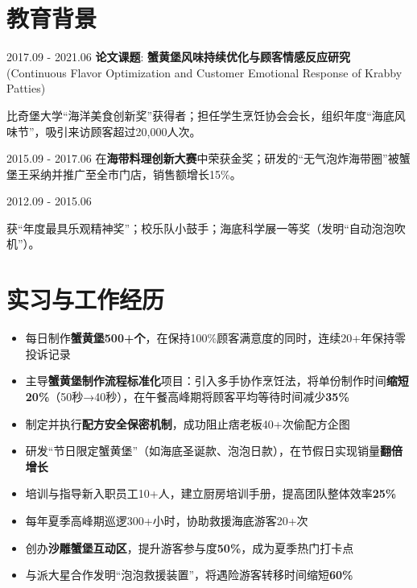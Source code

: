 \section{教育背景}

{2017.09 - 2021.06}
\textbf{论文课题}: \textbf{蟹黄堡风味持续优化与顾客情感反应研究} (Continuous Flavor Optimization and Customer Emotional Response of Krabby Patties)

比奇堡大学“海洋美食创新奖”获得者；担任学生烹饪协会会长，组织年度“海底风味节”，吸引来访顾客超过20,000人次。

{2015.09 - 2017.06}
在\textbf{海带料理创新大赛}中荣获金奖；研发的“无气泡炸海带圈”被蟹堡王采纳并推广至全市门店，销售额增长15\%。

{2012.09 - 2015.06}

获“年度最具乐观精神奖”；校乐队小鼓手；海底科学展一等奖（发明“自动泡泡吹机”）。

\section{实习与工作经历}

\begin{itemize}
  \item 每日制作\textbf{蟹黄堡500+个}，在保持100\%顾客满意度的同时，连续20+年保持零投诉记录
  \item 主导\textbf{蟹黄堡制作流程标准化}项目：引入多手协作烹饪法，将单份制作时间\textbf{缩短20\%}（50秒→40秒），在午餐高峰期将顾客平均等待时间减少\textbf{35\%}
  \item 制定并执行\textbf{配方安全保密机制}，成功阻止痞老板40+次偷配方企图
  \item 研发“节日限定蟹黄堡”（如海底圣诞款、泡泡日款），在节假日实现销量\textbf{翻倍增长}
  \item 培训与指导新入职员工10+人，建立厨房培训手册，提高团队整体效率\textbf{25\%}
\end{itemize}

\begin{itemize}
  \item 每年夏季高峰期巡逻300+小时，协助救援海底游客20+次
  \item 创办\textbf{沙雕蟹堡互动区}，提升游客参与度\textbf{50\%}，成为夏季热门打卡点
  \item 与派大星合作发明“泡泡救援装置”，将遇险游客转移时间缩短\textbf{60\%}
\end{itemize}

